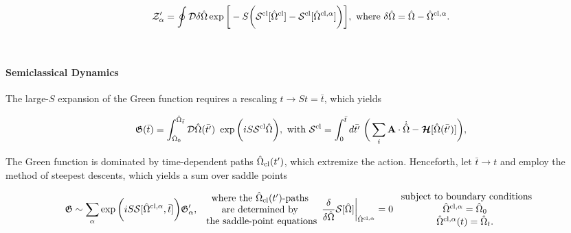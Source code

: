 \documentclass{homework}
\begin{document}
\begin{equation}
    \mathcal{Z}'_{\alpha} = \oint \mathcal{D}\delta \hat{\Omega} \exp\bigg[ -S \bigg(\mathcal{S}^{\textnormal{cl}}[\hat{\Omega}^{\textnormal{cl}}] - \mathcal{S}^{\textnormal{cl}}[\hat{\Omega}^{\textnormal{cl}, \alpha}] \bigg) \bigg], \textnormal{ where } \delta \hat{\Omega} = \hat{\Omega} - \hat{\Omega}^{\textnormal{cl}, \alpha}. 
\end{equation}

\blanky \\

\paragraph{Semiclassical Dynamics}

The large-$S$ expansion of the Green function requires a rescaling $t \rightarrow St = \bar{t}$, which yields

\begin{equation}
        \mathfrak{G}(\bar{t}) = \int_{\hat{\Omega}_0}^{\hat{\Omega}_{\bar{t}}} \mathcal{D} {\hat{\Omega}}(\bar{t'}) \textnormal{ } \exp \bigg(i S \mathcal{S}^{\textnormal{cl}} {\hat{\Omega}}\bigg), \textnormal{ with } \mathcal{S}^{\textnormal{cl}} = \int_{0}^{\bar{t}} d\bar{t'} \textnormal{ } \bigg(\sum_{i} {\bf A} \cdot \dot{\hat{\Omega}} - \bm{\mathcal{H}}[{\hat{\Omega}}(\bar{t'})]\bigg),
\end{equation}

The Green function is dominated by time-dependent paths $\hat{\Omega}_{\textnormal{cl}}(t')$, which extremize the action. Henceforth, let $\bar{t} \rightarrow t$ and employ the method of steepest descents, which yields a sum over saddle points 

\begin{equation}
    \mathfrak{G} \sim \sum_{\alpha} \exp \bigg(i S \mathcal{S}[\hat{\Omega}^{\textnormal{cl}, \alpha}, \bar{t}]\bigg) \mathfrak{G}'_{\alpha}, \begin{array}{cc}
         \textnormal{ where the $\hat{\Omega}_{\textnormal{cl}}(t')$-paths } \\
         \textnormal{ are determined by } \\
         \textnormal{ the saddle-point equations} 
    \end{array} \frac{\delta}{\delta \hat{\Omega}} \mathcal{S}[\hat{\Omega}]\bigg|_{\hat{\Omega}^{\textnormal{cl}, \alpha}} = 0 \begin{array}{cc}
         \textnormal{ subject to boundary conditions}  \\
         \hat{\Omega}^{\textnormal{cl}, \alpha} = \hat{\Omega}_0 \\
         \hat{\Omega}^{\textnormal{cl}, \alpha}(t) = \hat{\Omega}_t.
    \end{array}
\end{equation}
\end{document}
